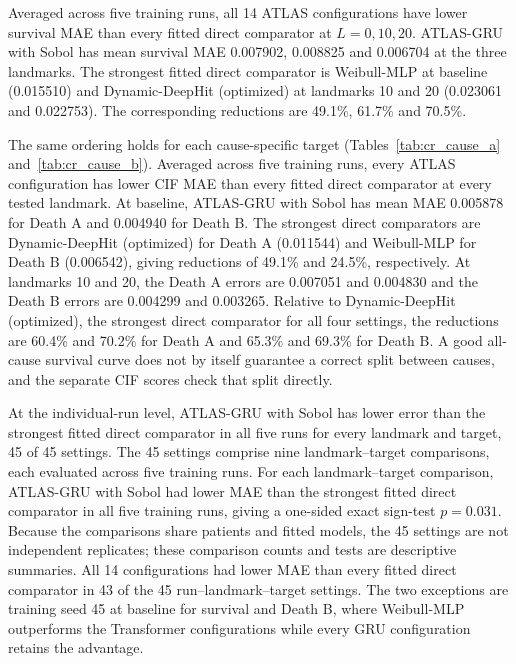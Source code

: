 

Averaged across five training runs, all 14 ATLAS configurations have lower survival MAE than every fitted direct comparator at $L=0,10,20$. ATLAS-GRU with Sobol has mean survival MAE 0.007902, 0.008825 and 0.006704 at the three landmarks. The strongest fitted direct comparator is Weibull-MLP at baseline (0.015510) and Dynamic-DeepHit (optimized) at landmarks 10 and 20 (0.023061 and 0.022753). The corresponding reductions are 49.1\%, 61.7\% and 70.5\%.




The same ordering holds for each cause-specific target (Tables~\ref{tab:cr_cause_a} and~\ref{tab:cr_cause_b}). Averaged across five training runs, every ATLAS configuration has lower CIF MAE than every fitted direct comparator at every tested landmark. At baseline, ATLAS-GRU with Sobol has mean MAE 0.005878 for Death A and 0.004940 for Death B. The strongest direct comparators are Dynamic-DeepHit (optimized) for Death A (0.011544) and Weibull-MLP for Death B (0.006542), giving reductions of 49.1\% and 24.5\%, respectively. At landmarks 10 and 20, the Death A errors are 0.007051 and 0.004830 and the Death B errors are 0.004299 and 0.003265. Relative to Dynamic-DeepHit (optimized), the strongest direct comparator for all four settings, the reductions are 60.4\% and 70.2\% for Death A and 65.3\% and 69.3\% for Death B. A good all-cause survival curve does not by itself guarantee a correct split between causes, and the separate CIF scores check that split directly.

At the individual-run level, ATLAS-GRU with Sobol has lower error than the strongest fitted direct comparator in all five runs for every landmark and target, 45 of 45 settings. The 45 settings comprise nine landmark--target comparisons, each evaluated across five training runs. For each landmark--target comparison, ATLAS-GRU with Sobol had lower MAE than the strongest fitted direct comparator in all five training runs, giving a one-sided exact sign-test $p=0.031$. Because the comparisons share patients and fitted models, the 45 settings are not independent replicates; these comparison counts and tests are descriptive summaries. All 14 configurations had lower MAE than every fitted direct comparator in 43 of the 45 run--landmark--target settings. The two exceptions are training seed 45 at baseline for survival and Death B, where Weibull-MLP outperforms the Transformer configurations while every GRU configuration retains the advantage.

